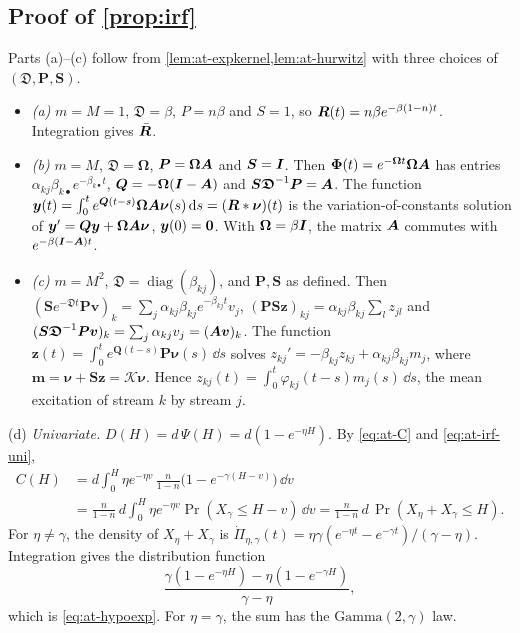 \subsection{Proof of \texorpdfstring{\cref{prop:irf}}{the impulse-response proposition}}\label{app:at-irf}

Parts (a)--(c) follow from \cref{lem:at-expkernel,lem:at-hurwitz} with three choices
of $(\bm{\mathfrak D},\bm P,\bm S)$.
\begin{itemize}
  \item \emph{(a)} $m=M=1$, $\mathfrak D=\beta$, $P=n\beta$ and $S=1$, so
  $\bm{R}(t)=n\beta e^{-\beta(1-n)t}$. Integration gives $\bar{\bm{R}}$.
  \item \emph{(b)} $m=M$, $\bm{\mathfrak D}=\bm\Omega$, $\bm P=\bm\Omega\bm{A}$ and
  $\bm S=\bm{I}$. Then $\bm{\Phi}(t)=e^{-\bm\Omega t}\bm\Omega\bm{A}$ has entries
  $\alpha_{kj}\beta_{k\bullet}e^{-\beta_{k\bullet}t}$,
  $\bm Q=-\bm\Omega(\bm{I}-\bm{A})$ and $\bm S\bm{\mathfrak D}^{-1}\bm P=\bm{A}$. The
  function $\bm y(t)=\int_0^te^{\bm Q(t-s)}\bm\Omega\bm{A}\bm\nu(s)\,\mathrm{d} s=(\bm{R}*\bm\nu)(t)$
  is the variation-of-constants solution of
  $\bm y'=\bm Q\bm y+\bm\Omega\bm{A}\bm\nu$, $\bm y(0)=\mathbf{0}$. With $\bm\Omega=\beta\bm{I}$,
  the matrix $\bm{A}$ commutes with $e^{-\beta(\bm{I}-\bm{A})t}$.
  \item \emph{(c)} $m=M^2$, $\bm{\mathfrak D}=\operatorname{diag}(\beta_{kj})$, and
  $\bm P,\bm S$ as defined. Then
  $(\bm Se^{-\bm{\mathfrak D}t}\bm P\bm v)_k=\sum_j\alpha_{kj}\beta_{kj}e^{-\beta_{kj}t}v_j$,
  $(\bm P\bm S\bm z)_{kj}=\alpha_{kj}\beta_{kj}\sum_lz_{jl}$ and
  $(\bm S\bm{\mathfrak D}^{-1}\bm P\bm v)_k=\sum_j\alpha_{kj}v_j=(\bm{A}\bm v)_k$. The
  function $\bm z(t)=\int_0^te^{\bm Q(t-s)}\bm P\bm\nu(s)\,\dd s$ solves
  $z_{kj}'=-\beta_{kj}z_{kj}+\alpha_{kj}\beta_{kj}m_j$, where
  $\bm m=\bm\nu+\bm S\bm z=\mathcal K\bm\nu$. Hence
  $z_{kj}(t)=\int_0^t\varphi_{kj}(t-s)m_j(s)\,\dd s$, the mean excitation of stream
  $k$ by stream $j$.
\end{itemize}

(d) \emph{Univariate.} $D(H)=d\,\Psi(H)=d(1-e^{-\eta H})$. By \eqref{eq:at-C} and
\eqref{eq:at-irf-uni},
\begin{align*}
C(H)&=d\int_0^H\eta e^{-\eta v}\,\frac{n}{1-n}\bigl(1-e^{-\gamma(H-v)}\bigr)\,\dd v\\
&=\frac{n}{1-n}\,d\int_0^H\eta e^{-\eta v}\Pr(X_\gamma\le H-v)\,\dd v
=\frac{n}{1-n}\,d\,\Pr(X_\eta+X_\gamma\le H).
\end{align*}
For $\eta\neq\gamma$, the density of $X_\eta+X_\gamma$ is
$\dot\Pi_{\eta,\gamma}(t)=\eta\gamma(e^{-\eta t}-e^{-\gamma t})/(\gamma-\eta)$.
Integration gives the distribution function
\[
\frac{\gamma(1-e^{-\eta H})-\eta(1-e^{-\gamma H})}{\gamma-\eta},
\]
which is \eqref{eq:at-hypoexp}. For $\eta=\gamma$, the sum has the $\mathrm{Gamma}(2,\gamma)$ law.

